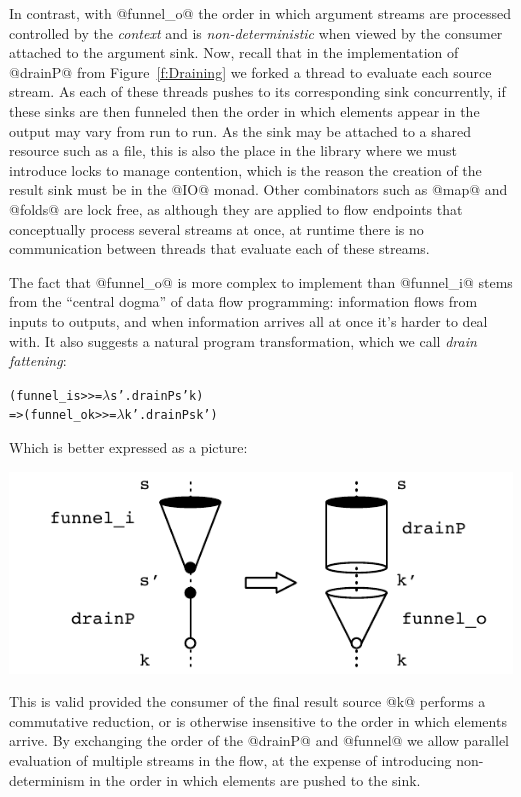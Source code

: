 In contrast, with @funnel_o@ the order in which argument streams are processed controlled by the \emph{context} and is \emph{non-deterministic} when viewed by the consumer attached to the argument sink. Now, recall that in the implementation of @drainP@ from Figure~\ref{f:Draining} we forked a thread to evaluate each source stream. As each of these threads pushes to its corresponding sink concurrently, if these sinks are then funneled then the order in which elements appear in the output may vary from run to run. As the sink may be attached to a shared resource such as a file, this is also the place in the library where we must introduce locks to manage contention, which is the reason the creation of the result sink must be in the @IO@ monad. Other combinators such as @map@ and @folds@ are lock free, as although they are applied to flow endpoints that conceptually process several streams at once, at runtime there is no communication between threads that evaluate each of these streams.

The fact that @funnel_o@ is more complex to implement than @funnel_i@ stems from the ``central dogma'' of data flow programming: information flows from inputs to outputs, and when information arrives all at once it's harder to deal with. It also suggests a natural program transformation, which we call \emph{drain fattening}:
\begin{alltt}
        (funnel_i s >>= \(\lambda\)s'. drainP s' k)
     => (funnel_o k >>= \(\lambda\)k'. drainP s  k')
\end{alltt}

Which is better expressed as a picture:
\begin{center}
\includegraphics[scale=0.8]{figures/drain-fatten.pdf}
\end{center}

This is valid provided the consumer of the final result source @k@ performs a commutative reduction, or is otherwise insensitive to the order in which elements arrive. By exchanging the order of the @drainP@ and @funnel@ we allow parallel evaluation of multiple streams in the flow, at the expense of introducing non-determinism in the order in which elements are pushed to the sink.

